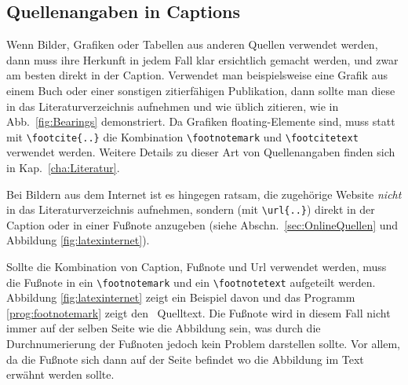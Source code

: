 \subsection{Quellenangaben in Captions}
\label{sec:QuellenangabenInCaptions}

Wenn Bilder, Grafiken oder Tabellen aus anderen Quellen verwendet werden, dann muss ihre Herkunft in jedem Fall klar ersichtlich gemacht werden, und zwar am besten direkt in der Caption.
Verwendet man beispielsweise eine Grafik aus einem Buch oder einer sonstigen zitierfähigen Publikation, dann sollte man diese in das Literaturverzeichnis aufnehmen und wie üblich zitieren, wie in Abb.\ \ref{fig:Bearings} demonstriert. Da Grafiken floating-Elemente sind, muss statt mit
\verb!\footcite{..}! die Kombination \verb!\footnotemark! und \verb!\footcitetext! verwendet werden. Weitere Details zu dieser Art von Quellenangaben finden sich in Kap.\ \ref{cha:Literatur}.

Bei Bildern aus dem Internet ist es hingegen ratsam, die zugehörige Website \emph{nicht} in das Literaturverzeichnis aufnehmen, sondern (mit \verb!\url{..}!) direkt in der Caption oder in einer Fußnote anzugeben (siehe Abschn.\ \ref{sec:OnlineQuellen} und Abbildung \ref{fig:latexinternet}). 

Sollte die Kombination von Caption, Fußnote und Url verwendet werden, muss die Fußnote in ein \verb!\footnotemark! und ein \verb!\footnotetext! aufgeteilt werden. Abbildung \ref{fig:latexinternet} zeigt ein Beispiel davon und das Programm \ref{prog:footnotemark} zeigt den \latex\ Quelltext. Die Fußnote wird in diesem Fall nicht immer auf der selben Seite wie die Abbildung sein, was durch die Durchnumerierung der Fußnoten jedoch kein Problem darstellen sollte. Vor allem, da die Fußnote sich dann auf der Seite befindet wo die Abbildung im Text erwähnt werden sollte. 


